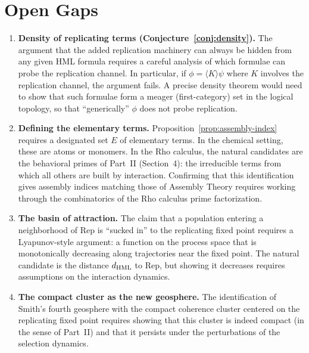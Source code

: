 \chapter{Open Gaps}
\label{sec:origins-gaps}

\begin{enumerate}[label=\textbf{Gap \arabic*.}, leftmargin=*, itemsep=8pt]

  \item \textbf{Density of replicating terms
        (Conjecture~\ref{conj:density}).}
        The argument that the added replication machinery can always
        be hidden from any given HML formula requires a careful
        analysis of which formulae can probe the replication channel.
        In particular, if $\phi = \langle K \rangle \psi$ where $K$
        involves the replication channel, the argument fails.
        A precise density theorem would need to show that such
        formulae form a meager (first-category) set in the logical
        topology, so that ``generically'' $\phi$ does not probe
        replication.

  \item \textbf{Defining the elementary terms.}
        Proposition~\ref{prop:assembly-index} requires a designated
        set $E$ of elementary terms.
        In the chemical setting, these are atoms or monomers.
        In the Rho calculus, the natural candidates are the
        behavioral primes of Part~II (Section~4): the irreducible
        terms from which all others are built by interaction.
        Confirming that this identification gives assembly indices
        matching those of Assembly Theory requires working through
        the combinatorics of the Rho calculus prime factorization.

  \item \textbf{The basin of attraction.}
        The claim that a population entering a neighborhood of
        $\mathrm{Rep}$ is ``sucked in'' to the replicating fixed
        point requires a Lyapunov-style argument: a function on the
        process space that is monotonically decreasing along
        trajectories near the fixed point.
        The natural candidate is the distance $d_{\mathrm{HML}}$ to
        $\mathrm{Rep}$, but showing it decreases requires
        assumptions on the interaction dynamics.

  \item \textbf{The compact cluster as the new geosphere.}
        The identification of Smith's fourth geosphere with the
        compact coherence cluster centered on the replicating fixed
        point requires showing that this cluster is indeed compact
        (in the sense of Part~II) and that it persists under the
        perturbations of the selection dynamics.


\end{enumerate}
